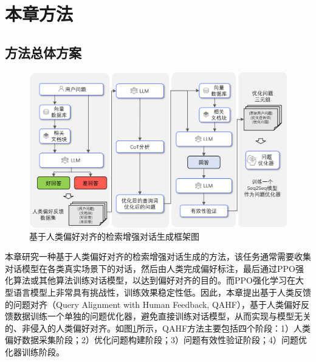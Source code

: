 \section{本章方法}

\subsection{方法总体方案}

\begin{figure}[htbp]
	\centering
	\includegraphics[scale=0.57]{Fig/qahf_framework.png}
	\caption{\label{qahf_framework}基于人类偏好对齐的检索增强对话生成框架图}
\end{figure}

本章研究一种基于人类偏好对齐的检索增强对话生成的方法，该任务通常需要收集对话模型在各类真实场景下的对话，然后由人类完成偏好标注，最后通过PPO强化算法或其他算法训练对话模型，以达到偏好对齐的目的。而PPO强化学习在大型语言模型上非常具有挑战性，训练效果稳定性低。因此，本章提出基于人类反馈的问题对齐（Query Alignment with Human Feedback, QAHF），基于人类偏好反馈数据训练一个单独的问题优化器，避免直接训练对话模型，从而实现与模型无关的、非侵入的人类偏好对齐。如图\ref{qahf_framework}所示，QAHF方法主要包括四个阶段：1）人类偏好数据采集阶段；2）优化问题构建阶段；3）问题有效性验证阶段；4）问题优化器训练阶段。

